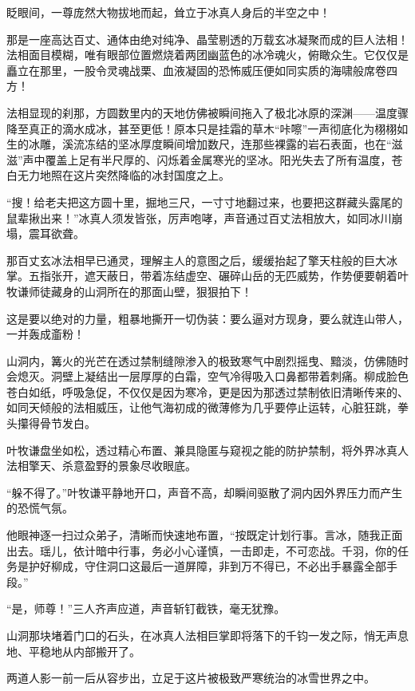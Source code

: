 眨眼间，一尊庞然大物拔地而起，耸立于冰真人身后的半空之中！

那是一座高达百丈、通体由绝对纯净、晶莹剔透的万载玄冰凝聚而成的巨人法相！法相面目模糊，唯有眼部位置燃烧着两团幽蓝色的冰冷魂火，俯瞰众生。它仅仅是矗立在那里，一股令灵魂战栗、血液凝固的恐怖威压便如同实质的海啸般席卷四方！

法相显现的刹那，方圆数里内的天地仿佛被瞬间拖入了极北冰原的深渊——温度骤降至真正的滴水成冰，甚至更低！原本只是挂霜的草木“咔嚓”一声彻底化为栩栩如生的冰雕，溪流冻结的坚冰厚度瞬间增加数尺，连那些裸露的岩石表面，也在“滋滋”声中覆盖上足有半尺厚的、闪烁着金属寒光的坚冰。阳光失去了所有温度，苍白无力地照在这片突然降临的冰封国度之上。

“搜！给老夫把这方圆十里，掘地三尺，一寸寸地翻过来，也要把这群藏头露尾的鼠辈揪出来！”冰真人须发皆张，厉声咆哮，声音通过百丈法相放大，如同冰川崩塌，震耳欲聋。

那百丈玄冰法相早已通灵，理解主人的意图之后，缓缓抬起了擎天柱般的巨大冰掌。五指张开，遮天蔽日，带着冻结虚空、碾碎山岳的无匹威势，作势便要朝着叶牧谦师徒藏身的山洞所在的那面山壁，狠狠拍下！

这是要以绝对的力量，粗暴地撕开一切伪装：要么逼对方现身，要么就连山带人，一并轰成齑粉！

\vspace{2em}

山洞内，篝火的光芒在透过禁制缝隙渗入的极致寒气中剧烈摇曳、黯淡，仿佛随时会熄灭。洞壁上凝结出一层厚厚的白霜，空气冷得吸入口鼻都带着刺痛。柳成脸色苍白如纸，呼吸急促，不仅仅是因为寒冷，更是因为那透过禁制依旧清晰传来的、如同天倾般的法相威压，让他气海初成的微薄修为几乎要停止运转，心脏狂跳，拳头攥得骨节发白。

叶牧谦盘坐如松，透过精心布置、兼具隐匿与窥视之能的防护禁制，将外界冰真人法相擎天、杀意盈野的景象尽收眼底。

“躲不得了。”叶牧谦平静地开口，声音不高，却瞬间驱散了洞内因外界压力而产生的恐慌气氛。

他眼神逐一扫过众弟子，清晰而快速地布置，“按既定计划行事。言冰，随我正面出去。瑶儿，依计暗中行事，务必小心谨慎，一击即走，不可恋战。千羽，你的任务是护好柳成，守住洞口这最后一道屏障，非到万不得已，不必出手暴露全部手段。”

“是，师尊！”三人齐声应道，声音斩钉截铁，毫无犹豫。

\vspace{2em}

山洞那块堵着门口的石头，在冰真人法相巨掌即将落下的千钧一发之际，悄无声息地、平稳地从内部搬开了。

两道人影一前一后从容步出，立足于这片被极致严寒统治的冰雪世界之中。

